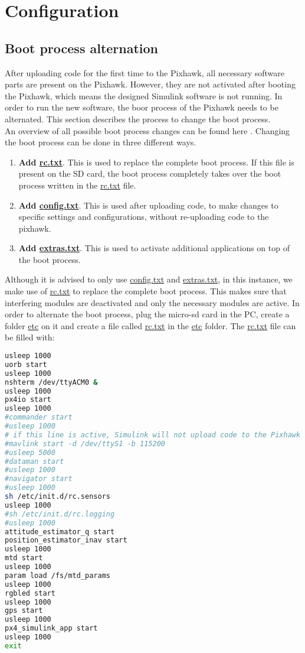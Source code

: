 \chapter{Configuration}
\section{Boot process alternation}
After uploading code for the first time to the Pixhawk, all necessary software parts are present on the Pixhawk. However, they are not activated after booting the Pixhawk, which means the designed Simulink software is not running. In order to run the new software, the boor process of the Pixhawk needs to be alternated. This section describes the process to change the boot process.\\
\newline
An overview of all possible boot process changes can be found here \cite{Boot_Process}. Changing the boot process can be done in three different ways.
\begin{enumerate}
\item \textbf{Add \url{rc.txt}}. This is used to replace the complete boot process. If this file is present on the SD card, the boot process completely takes over the boot process written in the \url{rc.txt} file.
\item \textbf{Add \url{config.txt}}. This is used after uploading code, to make changes to specific settings and configurations, without re-uploading code to the pixhawk.
\item \textbf{Add \url{extras.txt}}. This is used to activate additional applications on top of the boot process.
\end{enumerate}
Although it is advised to only use \url{config.txt} and \url{extras.txt}, in this instance, we make use of \url{rc.txt} to replace the complete boot process. This makes sure that interfering modules are deactivated and only the necessary modules are active.
In order to alternate the boot process, plug the micro-sd card in the PC, create a folder \url{etc} on it and create a file called \url{rc.txt} in the \url{etc} folder. The \url{rc.txt} file can be filled with:
\begin{lstlisting}[language=sh]
usleep 1000
uorb start
usleep 1000
nshterm /dev/ttyACM0 &
usleep 1000
px4io start
usleep 1000
#commander start
#usleep 1000
# if this line is active, Simulink will not upload code to the Pixhawk via usb
#mavlink start -d /dev/ttyS1 -b 115200
#usleep 5000
#dataman start
#usleep 1000
#navigator start
#usleep 1000
sh /etc/init.d/rc.sensors
usleep 1000
#sh /etc/init.d/rc.logging
#usleep 1000
attitude_estimator_q start
position_estimator_inav start
usleep 1000
mtd start
usleep 1000
param load /fs/mtd_params
usleep 1000
rgbled start
usleep 1000
gps start
usleep 1000
px4_simulink_app start
usleep 1000
exit
\end{lstlisting}
